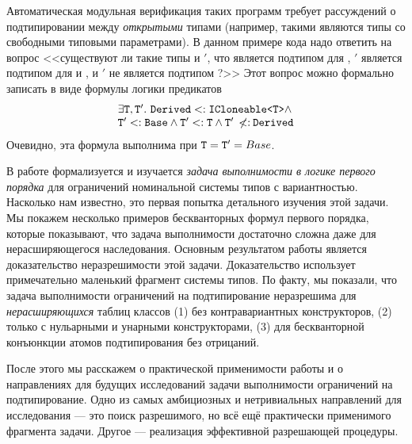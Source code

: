 Автоматическая модульная верификация таких программ требует рассуждений о подтипировании между \emph{открытыми} типами (например, такими являются типы со свободными типовыми параметрами). В данном примере кода надо ответить на вопрос <<существуют ли такие типы \ttypeparam{} и \ttypeparam{}$'$, что \derivedtype{} является подтипом для \onector{\icloneable{}}{\ttypeparam{}}, \ttypeparam{}$'$ является подтипом для \basetype{} и \ttypeparam{}, и \ttypeparam{}$'$ не является подтипом \derivedtype{}?>> Этот вопрос можно формально записать в виде формулы логики предикатов
\[
    \begin{array}{l}
    \exists \texttt{T}{}, \texttt{T}{}'.\,\, \texttt{Derived}{}<:{}\texttt{ICloneable}{}\texttt{<}\texttt{T}{}\texttt{>} \wedge \\ \texttt{T}{}'<:{}\texttt{Base}{} \wedge \texttt{T}{}'<:{}\texttt{T}{} \wedge \texttt{T}{}'\:\not\!\!{<:}\:{}\texttt{Derived}{}
    \end{array}
\]
Очевидно, эта формула выполнима при $\texttt{T}{}=\texttt{T}{}'=Base$.

В работе формализуется и изучается \emph{задача выполнимости в логике первого порядка} для ограничений номинальной системы типов с вариантностью. Насколько нам известно, это первая попытка детального изучения этой задачи. Мы покажем несколько примеров бескванторных формул первого порядка, которые показывают, что задача выполнимости достаточно сложна даже для нерасширяющегося наследования. Основным результатом работы является доказательство неразрешимости этой задачи. Доказательство использует примечательно маленький фрагмент системы типов. По факту, мы показали, что задача выполнимости ограничений на подтипирование неразрешима для \emph{нерасширяющихся} таблиц классов (1) без контравариантных конструкторов, (2) только с нульарными и унарными конструкторами, (3) для бескванторной конъюнкции атомов подтипирования без отрицаний.

После этого мы расскажем о  практической применимости работы и о направлениях для будущих исследований задачи выполнимости ограничений на подтипирование. Одно из самых амбициозных и нетривиальных направлений для исследования --- это поиск разрешимого, но всё ещё практически применимого фрагмента задачи. Другое --- реализация эффективной разрешающей процедуры.
